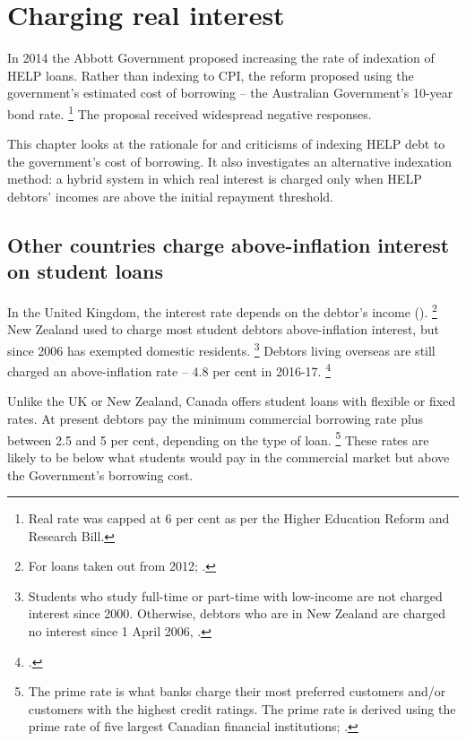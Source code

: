 \documentclass[embargoed]{grattan}
\begin{document}
\chapter{Charging real interest}\label{chap:5-charging-real-interest}

In 2014 the Abbott Government proposed increasing the rate of indexation of \gls{HELP} loans.
Rather than indexing to \gls{CPI}, the reform proposed using the government's estimated cost of borrowing -- the Australian Government's 10-year bond rate.%
\footnote{Real rate was capped at 6 per cent as per the Higher Education Reform and Research Bill.} 
The proposal received widespread negative responses.

This chapter looks at the rationale for and criticisms of indexing \gls{HELP} debt to the government's cost of borrowing.
It also investigates an alternative indexation method: a hybrid system in which real interest is charged only when \gls{HELP} debtors' incomes are above the initial repayment threshold.

\section{Other countries charge above-inflation interest on student loans}\label{other-countries-charge-above-inflation-interest-on-student-loans}

In the United Kingdom, the interest rate depends on the debtor's income ().%
\footnote{For loans taken out from 2012; \textcite{Company2015Changesinterestrates}.}
New Zealand used to charge most student debtors above-inflation interest, but since 2006 has exempted domestic residents.%
\footnote{Students who study full-time or part-time with low-income are not charged interest since 2000.
Otherwise, debtors who are in New Zealand are charged no interest since 1 April 2006, \textcite[][50]{EducationNZ2015Studentloanscheme}.} 
Debtors living overseas are still charged an above-inflation rate -- 4.8 per cent in 2016-17.%
\footcite{InlandRevenue2016Interestothercharges}

Unlike the UK or New Zealand, Canada offers student loans with flexible or fixed rates.
At present debtors pay the minimum commercial borrowing rate plus between 2.5 and 5 per cent, depending on the type of loan.%
\footnote{The prime rate is what banks charge their most preferred customers and/or customers with the highest credit ratings.
The prime rate is derived using the prime rate of five largest Canadian financial institutions; \textcites{Canada2016InterestratesCanada}{Canada2016LoanRepaymentEstimator}.} 
These rates are likely to be below what students would pay in the commercial market but above the Government's borrowing cost.
\end{document}
